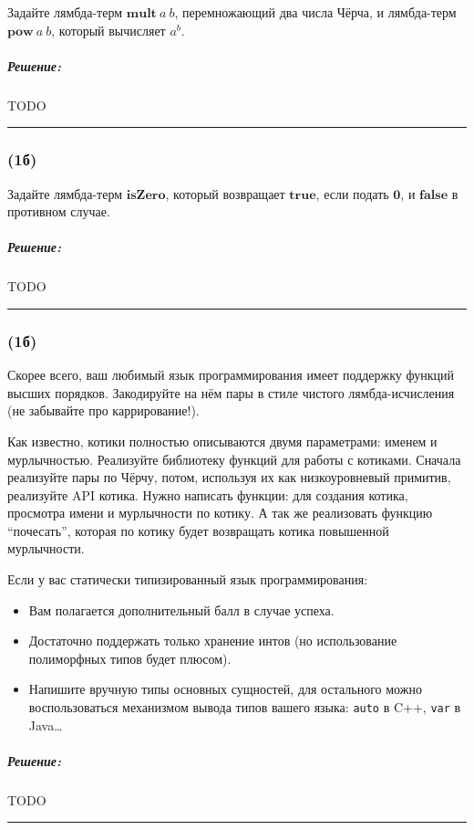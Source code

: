 \documentclass{article}
\newenvironment{proof}{\subparagraph{\hspace{-1em}Решение:\newline}}{\par\noindent\rule{\textwidth}{0.4pt}}
\newcommand{\term}[1]{\mathbf{#1}}
\begin{document}
    Задайте лямбда-терм $\term{mult}~a~b$, перемножающий два числа Чёрча, и лямбда-терм $\term{pow}~a~b$, который вычисляет $a^b$.

    \begin{proof}
        TODO %
    \end{proof}

    \subsubsection{(1б)}

    Задайте лямбда-терм $\term{isZero}$, который возвращает $\term{true}$, если подать $\term{0}$, и $\term{false}$ в противном случае.

    \begin{proof}
        TODO %
    \end{proof}

    \subsubsection{(1б)}

    Скорее всего, ваш любимый язык программирования имеет поддержку функций высших порядков.
    Закодируйте на нём пары в стиле чистого лямбда-исчисления (не забывайте про каррирование!).

    Как известно, котики полностью описываются двумя параметрами: именем и мурлычностью.
    Реализуйте библиотеку функций для работы с котиками.
    Сначала реализуйте пары по Чёрчу, потом, используя их как низкоуровневый примитив, реализуйте API котика.
    Нужно написать функции: для создания котика, просмотра имени и мурлычности по котику.
    А так же реализовать функцию ``почесать'', которая по котику будет возвращать котика повышенной мурлычности.

    Если у вас статически типизированный язык программирования:
    \begin{itemize}
        \item Вам полагается дополнительный балл в случае успеха.
        \item Достаточно поддержать только хранение интов (но использование полиморфных типов будет плюсом).
        \item Напишите вручную типы основных сущностей, для остального можно воспользоваться механизмом вывода типов вашего языка: \texttt{auto} в C++, \texttt{var} в Java\ldots
    \end{itemize}

    \begin{proof}
        TODO %
    \end{proof}
\end{document}
